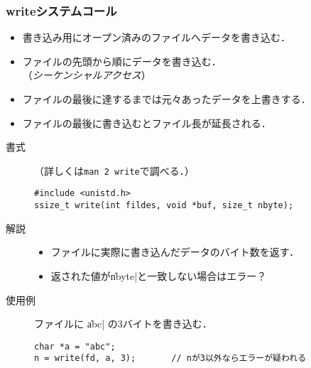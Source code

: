 \documentclass{beamer}                 %
\begin{document}
\begin{frame}[fragile]
  \frametitle{writeシステムコール}
\begin{itemize}
\item 書き込み用にオープン済みのファイルへデータを書き込む．
\item ファイルの先頭から順にデータを書き込む．\\
（\emph{シーケンシャルアクセス}）
\item ファイルの最後に達するまでは元々あったデータを上書きする．
\item ファイルの最後に書き込むとファイル長が延長される．
\end{itemize}

\begin{description}
\item[書式]（詳しくは\texttt{man 2 write}で調べる．）
\begin{lstlisting}[numbers=none]
#include <unistd.h>
ssize_t write(int fildes, void *buf, size_t nbyte);
\end{lstlisting}

\item[解説]
\begin{itemize}
\item ファイルに実際に書き込んだデータのバイト数を返す．
\item 返された値が\|nbyte|と一致しない場合はエラー？
\end{itemize}

\item[使用例]
ファイルに \|abc| の3バイトを書き込む．
\begin{lstlisting}[numbers=none]
char *a = "abc";
n = write(fd, a, 3);       // nが3以外ならエラーが疑われる
\end{lstlisting}
\end{description}
\end{frame}
\end{document}
